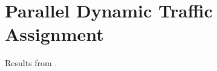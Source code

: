 \chapter{Parallel Dynamic Traffic Assignment} \label{a:parallel}
Results from \citep{attanasi2015real}.